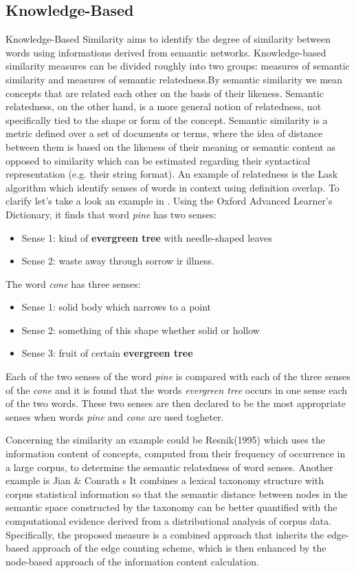 \clearpage
\subsection{Knowledge-Based}
Knowledge-Based Similarity aims to identify the degree of similarity between words using informations derived from semantic networks.
Knowledge-based similarity measures can be divided roughly into two groups: measures of semantic similarity and measures of semantic relatedness.By semantic similarity we mean concepts that are related each other on the basis of their likeness.
Semantic relatedness, on the other hand, is a more general notion of relatedness, not specifically tied to the shape or form of the concept. Semantic similarity is a metric defined over a set of documents or terms, where the idea of distance between them is based on the likeness of their meaning or semantic content as opposed to similarity which can be estimated regarding their syntactical representation (e.g. their string format).
An example of relatedness is the Lask algorithm which identify senses of words in context using definition overlap. To clarify let's take a look an example in \cite{Resnik}.
Using the Oxford Advanced Learner's Dictionary, it finds that word \emph{pine} has two senses:
\begin{itemize}
	\item{Sense 1: kind of \textbf{evergreen tree} with needle-shaped leaves}
	\item{Sense 2: waste away through sorrow ir illness.}
\end{itemize}

The word \emph{cone} has three senses:
\begin{itemize}
	\item{Sense 1: solid body which narrows to a point}
	\item{Sense 2: something of this shape whether solid or hollow}
	\item{Sense 3: fruit of certain \textbf{evergreen tree}}
\end{itemize}

Each of the two senses of the word \emph{pine} is compared with each of the three senses of the \emph{cone} and it is found that the words \emph{evergreen tree} occurs in one sense each of the two words. These two senses are then declared to be the most appropriate senses when words \emph{pine} and \emph{cone} are used togheter.

Concerning the similarity an example could be Resnik(1995) which uses the information content of concepts, computed from their frequency of occurrence in a large corpus, to determine the semantic relatedness of word senses\cite{Resnik}.
Another example is Jian \& Conrath \cite{Jian}s It combines a lexical taxonomy structure with corpus statistical information so that the semantic distance between nodes in the semantic space constructed by the taxonomy can be better quantified with the computational evidence derived from a distributional analysis of corpus data. Specifically, the proposed measure is a combined approach that inherits the edge-based approach of the edge counting scheme, which is then enhanced by the node-based approach of the information content calculation.
